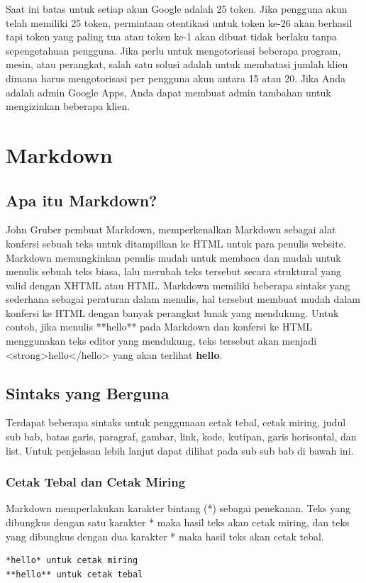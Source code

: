 Saat ini batas untuk setiap akun Google adalah 25 token. Jika pengguna akun telah memiliki 25 token, permintaan otentikasi untuk token ke-26 akan berhasil tapi token yang paling tua atau token ke-1 akan dibuat tidak berlaku tanpa sepengetahuan pengguna.
Jika perlu untuk mengotorisasi beberapa program, mesin, atau perangkat, salah satu solusi adalah untuk membatasi jumlah klien dimana harus mengotorisasi per pengguna akun antara 15 atau 20. Jika Anda adalah admin Google Apps, Anda dapat membuat admin tambahan untuk mengizinkan beberapa klien.

\section{Markdown}
\label{sec:markdown}

\subsection{Apa itu Markdown? \cite{Markguide:2015}}
John Gruber pembuat Markdown, memperkenalkan Markdown sebagai alat konfersi sebuah teks untuk ditampilkan ke HTML untuk para penulis website. Markdown memungkinkan penulis mudah untuk membaca dan mudah untuk menulis sebuah teks biasa, lalu merubah teks tersebut secara struktural yang valid dengan XHTML atau HTML.
Markdown memiliki beberapa sintaks yang sederhana sebagai peraturan dalam menulis, hal tersebut membuat mudah dalam konfersi ke HTML dengan banyak perangkat lunak yang mendukung.
Untuk contoh, jika menulis **hello** pada Markdown dan konfersi ke HTML menggunakan teks editor yang mendukung, teks tersebut akan menjadi <strong>hello</hello> yang akan terlihat \textbf{hello}.

\subsection{Sintaks yang Berguna \cite{Markguide:2015}}
Terdapat beberapa sintaks untuk penggunaan cetak tebal, cetak miring, judul sub bab, batas garis, paragraf, gambar, link, kode, kutipan, garis horisontal, dan list. Untuk penjelasan lebih lanjut dapat dilihat pada sub sub bab di bawah ini.

\subsubsection{Cetak Tebal dan Cetak Miring}
Markdown memperlakukan karakter bintang (*) sebagai penekanan. Teks yang dibungkus dengan satu karakter * maka hasil teks akan cetak miring, dan teks yang dibungkus dengan dua karakter * maka hasil teks akan cetak tebal.
\begin{lstlisting}
*hello* untuk cetak miring
**hello** untuk cetak tebal
\end{lstlisting}

